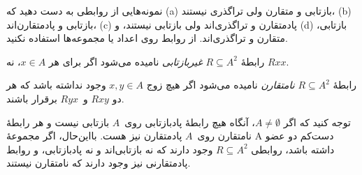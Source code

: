 \documentclass[../../../include/open-logic-section]{subfiles}
\begin{document}
\begin{prob}
نمونه‌هایی از روابطی به دست دهید که (a) بازتابی و متقارن ولی
تراگذری نیستند، (b) بازتابی و پادمتقارن‌اند، (c) پادمتقارن و تراگذری‌اند
ولی بازتابی نیستند، و (d) بازتابی، متقارن و تراگذری‌اند. از روابط روی اعداد
یا مجموعه‌ها استفاده نکنید.
\end{prob}

\begin{defn}
رابطهٔ $R \subseteq A^2$ \emph{غیربازتابی} نامیده می‌شود اگر برای هر $x \in
A$، نه $Rxx$.
\end{defn}

\begin{defn}[نامتقارنی]
رابطهٔ $R \subseteq A^2$ \emph{نامتقارن} نامیده می‌شود اگر هیچ زوج $x,y\in
A$ وجود نداشته باشد که هر دو $Rxy$ و~$Ryx$ برقرار باشند.
\end{defn}

توجه کنید که اگر $A \neq \emptyset$، آنگاه هیچ رابطهٔ پادبازتابی
روی~$A$ بازتابی نیست و هر رابطهٔ نامتقارن روی~$A$ پادمتقارن نیز هست.
بااین‌حال، اگر مجموعهٔ A دست‌کم دو عضو داشته باشد، روابطی $R \subseteq A^2$
وجود دارند که نه بازتابی‌اند و نه پادبازتابی، و روابط پادمتقارنی نیز
وجود دارند که نامتقارن نیستند.
\end{document}
